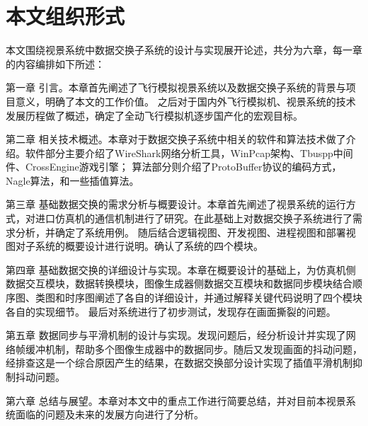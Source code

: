 \section{本文组织形式}
本文围绕视景系统中数据交换子系统的设计与实现展开论述，共分为六章，每一章的内容编排如下所述：\par
第一章 引言。本章首先阐述了飞行模拟视景系统以及数据交换子系统的背景与项目意义，明确了本文的工作价值。
       之后对于国内外飞行模拟机、视景系统的技术发展历程做了概述，确定了全动飞行模拟机逐步国产化的宏观目标。\par
第二章 相关技术概述。本章对于数据交换子系统中相关的软件和算法技术做了介绍。软件部分主要介绍了WireShark网络分析工具，WinPcap架构、Tbuspp中间件、CrossEngine游戏引擎；
       算法部分则介绍了ProtoBuffer协议的编码方式，Nagle算法，和一些插值算法。\par
第三章 基础数据交换的需求分析与概要设计。本章首先阐述了视景系统的运行方式，对进口仿真机的通信机制进行了研究。在此基础上对数据交换子系统进行了需求分析，并确定了系统用例。
       随后结合逻辑视图、开发视图、进程视图和部署视图对子系统的概要设计进行说明。确认了系统的四个模块。\par
第四章 基础数据交换的详细设计与实现。本章在概要设计的基础上，为仿真机侧数据交互模块，数据转换模块，图像生成器侧数据交互模块和数据同步模块结合顺序图、类图和时序图阐述了各自的详细设计，并通过解释关键代码说明了四个模块各自的实现细节。
       最后对系统进行了初步测试，发现存在画面撕裂的问题。\par
第五章 数据同步与平滑机制的设计与实现。发现问题后，经分析设计并实现了网络帧缓冲机制，帮助多个图像生成器中的数据同步。随后又发现画面的抖动问题，经排查这是一个综合原因产生的结果，在数据交换部分设计实现了插值平滑机制抑制抖动问题。\par
第六章 总结与展望。本章对本文中的重点工作进行简要总结，并对目前本视景系统面临的问题及未来的发展方向进行了分析。